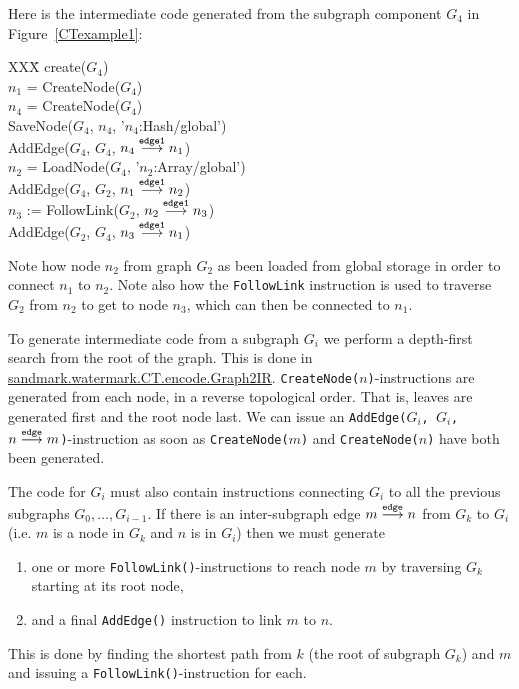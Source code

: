 Here is the intermediate code generated from the subgraph
component $G_4$ in Figure~\ref{CTexample1}:
\begin{tt}
\begin{tabbing}
XXX\=\kill
create($G_4$) \\
\>   $n_1$ = CreateNode($G_4$) \\
\>   $n_4$ = CreateNode($G_4$) \\
\>   SaveNode($G_4$, $n_4$, '$n_4$:Hash/global') \\
\>   AddEdge($G_4$, $G_4$, $n_4\stackrel{{\tt edge1}}{\longrightarrow}n_1$) \\
\>   $n_2$ = LoadNode($G_4$, '$n_2$:Array/global') \\
\>   AddEdge($G_4$, $G_2$, $n_1\stackrel{{\tt edge1}}{\longrightarrow}n_2$) \\
\>   $n_3$ := FollowLink($G_2$, $n_2\stackrel{{\tt edge1}}{\longrightarrow}n_3$) \\
\>   AddEdge($G_2$, $G_4$, $n_3\stackrel{{\tt edge1}}{\longrightarrow}n_1$)
\end{tabbing}
\end{tt}
Note how node $n_2$ from graph $G_2$ as been loaded from global storage
in order to connect $n_1$ to $n_2$. Note also how the {\tt FollowLink}
instruction is used to traverse $G_2$ from $n_2$ to get to node
$n_3$, which can then be connected to $n_1$.

To generate intermediate code from a subgraph $G_i$ we
perform a depth-first search from the root of the graph.
This is done in \url{sandmark.watermark.CT.encode.Graph2IR}.
{\tt CreateNode($n$)}-instructions are generated from
each node, in a reverse topological order. That is,
leaves are generated first and the root node last. 
We can issue an
{\tt AddEdge($G_i$, $G_i$, $n\stackrel{{\tt edge}}{\longrightarrow}m$)}-instruction
as soon as {\tt CreateNode($m$)} and {\tt CreateNode($n$)} have 
both been generated. 

The code for $G_i$ must also contain
instructions connecting $G_i$ to all the previous
subgraphs $G_0,\ldots,G_{i-1}$. If there is an inter-subgraph
edge $m\stackrel{{\tt edge}}{\longrightarrow}n$ from
$G_k$ to $G_i$ (i.e. $m$ is a node in $G_k$ and 
$n$ is in $G_i$) then we must generate
\begin{enumerate}
   \item one or more {\tt FollowLink()}-instructions to 
         reach node $m$ by traversing $G_k$ 
         starting at its root node,
   \item and a final {\tt AddEdge()} instruction to
         link $m$ to $n$.
\end{enumerate}
This is done by finding the shortest path from
$k$ (the root of subgraph $G_k$) and $m$ and
issuing a {\tt FollowLink()}-instruction for each.


